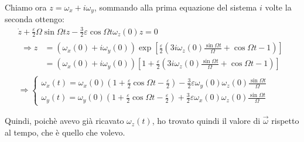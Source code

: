 \documentclass[../main.tex]{subfiles}
\begin{document}
Chiamo ora $z=\omega_x+i \omega_y$, sommando alla prima equazione del sistema $i$ volte la seconda ottengo:
\begin{gather*}
	\dot z+\frac{\varepsilon}2 \Omega \sin\Omega t z - \frac 32 \varepsilon\cos\Omega t \omega_z(0)z=0\\
	\begin{split}
	\Longrightarrow z&=(\omega_x(0)+i\omega_y(0))\exp\left[\frac\varepsilon 2 \left(3i\omega_z(0)\frac{\sin\Omega t}{\Omega}+\cos\Omega t -1\right)\right]\\
	&=(\omega_x(0)+i\omega_y(0))\left[1+\frac\varepsilon 2 \left(3i\omega_z(0)\frac{\sin\Omega t}{\Omega}+\cos\Omega t -1\right)\right]
	\end{split}\\
	\Longrightarrow 
	\begin{cases}
		\omega_x(t)=\omega_x(0)\left( 1+\frac \varepsilon 2 \cos\Omega t -\frac\varepsilon 2 \right) - \frac 32 \varepsilon \omega_y(0)\omega_z(0)\frac{\sin \Omega t}{\Omega}\\
		\omega_y(t)=\omega_y(0)\left( 1+\frac \varepsilon 2 \cos\Omega t -\frac\varepsilon 2 \right) + \frac 32 \varepsilon \omega_x(0)\omega_z(0)\frac{\sin \Omega t}{\Omega}
	\end{cases}
\end{gather*}

Quindi, poichè avevo già ricavato $\omega_z(t)$, ho trovato quindi il valore di $\vec\omega$ rispetto al tempo, che è quello che volevo.
\end{document}
